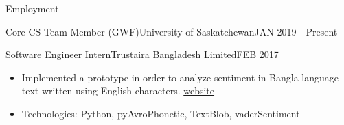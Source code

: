 \documentclass[]{mcdowellcv}
\begin{document}
\begin{cvsection}{Employment}
\begin{cvsubsection}{Core CS Team Member (GWF)}{University of Saskatchewan}{JAN 2019 - Present}
\begin{itemize}
    	    \end{itemize}
    	
        \end{cvsubsection}
	
    	\begin{cvsubsection}{Software Engineer Intern}{Trustaira Bangladesh Limited}{FEB 2017}
    	    \begin{itemize}
    	        \item Implemented a prototype in order to analyze sentiment in Bangla language text written using English characters. \href{https://techfoxweb.wordpress.com/2017/07/24/banglish-sentiment-analysis/}{website}
    	        \item Technologies: Python, pyAvroPhonetic, TextBlob, vaderSentiment 
    	        
    	    \end{itemize}
    	
    	\end{cvsubsection}
    	
    
        
    	        
    	
	
	
	
	\end{cvsection}
	
\end{document}
